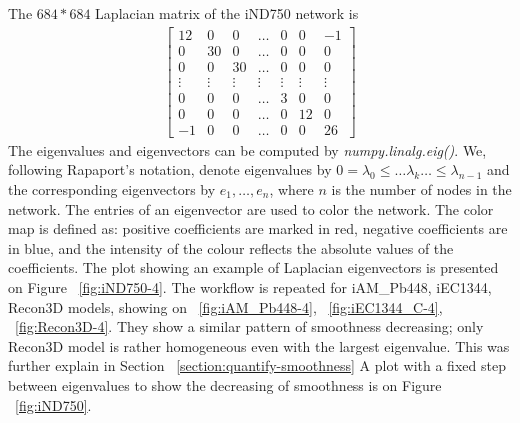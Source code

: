 \documentclass{article} %
\begin{document}
The $684*684$ Laplacian matrix of the iND750 network is
\begin{equation*}
\begin{aligned}
\begin{bmatrix}
12 & 0 & 0 & \dots & 0 & 0 & -1\\
0 & 30 & 0 & \dots & 0 & 0 & 0 \\
0 & 0 & 30 & \dots & 0 & 0 & 0 \\
\vdots & \vdots & \vdots & \vdots & \vdots & \vdots &\vdots\\
0 & 0 & 0 & \dots & 3 & 0 & 0 \\
0 & 0 & 0 & \dots & 0 & 12& 0 \\
-1 & 0 & 0 & \dots & 0 & 0 & 26
\end{bmatrix}
\end{aligned}
\end{equation*}
The eigenvalues and eigenvectors can be computed by \textit{numpy.linalg.eig()}. We, following Rapaport's notation, denote eigenvalues by $0 = \lambda_0 \leq \dots \lambda_k \dots \leq \lambda_{n-1}$ and the corresponding eigenvectors by $e_1,\dots,e_n$, where $n$ is the number of nodes in the network. The entries of an eigenvector are used to color the network. The color map is defined as: positive coefficients are marked in red, negative coefficients are in blue, and the intensity of the colour reflects the absolute values of the coefficients. The plot showing an example of Laplacian eigenvectors is presented on Figure ~\ref{fig:iND750-4}. The workflow is repeated for iAM\_Pb448, iEC1344, Recon3D models, showing on ~\ref{fig:iAM_Pb448-4}, ~\ref{fig:iEC1344_C-4}, ~\ref{fig:Recon3D-4}. They show a similar pattern of smoothness decreasing; only Recon3D model is rather homogeneous even with the largest eigenvalue. This was further explain in Section ~\ref{section:quantify-smoothness} A plot with a fixed step between eigenvalues to show the decreasing of smoothness is on Figure ~\ref{fig:iND750}. 
\end{document}
